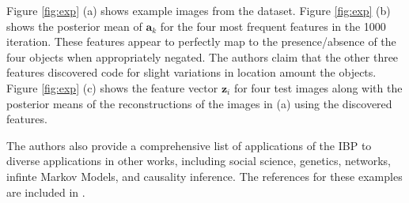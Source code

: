 \documentclass[twoside]{article}
\begin{document}
Figure \ref{fig:exp} (a) shows example images from the dataset. Figure \ref{fig:exp} (b) shows the posterior mean of $\mathbf{a}_k$ for the four most frequent features in the 1000 iteration. These features appear to perfectly map to the presence/absence of the four objects when appropriately negated. The authors claim that the other three features discovered code for slight variations in location amount the objects.  Figure \ref{fig:exp} (c) shows the feature vector $\mathbf{z}_i$ for four test images along with the posterior means of the reconstructions of the images in (a) using the discovered features.

The authors also provide a comprehensive list of applications of the IBP to diverse applications in other works, including social science, genetics, networks, infinte Markov Models, and causality inference. The references for these examples are included in \citet{Griffiths2011}.



\end{document}
